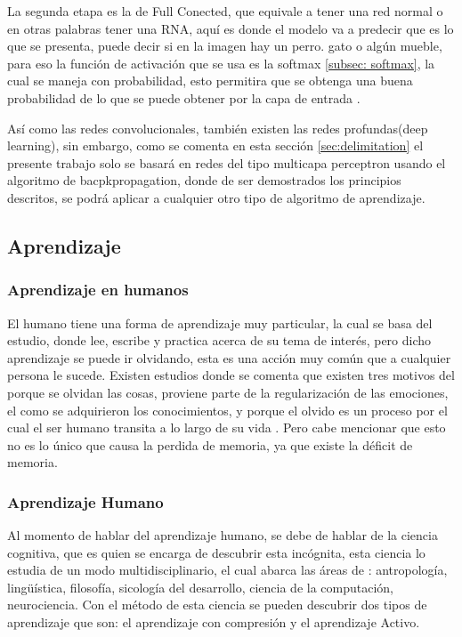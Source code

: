             La segunda etapa es la de Full Conected, que equivale a tener una red normal o en otras palabras tener una RNA, aqu\'i 
            es donde el modelo va a predecir que es lo que se presenta, puede decir si en la imagen hay un perro. gato o alg\'un mueble, 
            para eso la funci\'on de activaci\'on que se usa es la softmax \eqref{subsec: softmax}, la cual se maneja con probabilidad, esto
            permitira que se obtenga una buena probabilidad de lo que se puede obtener por la capa de entrada \cite{duran2017,Ortiz2020}.
            
            Así como las redes convolucionales, también existen las redes profundas(deep learning), sin embargo, como se comenta en esta 
            sección \eqref{sec:delimitation} el presente trabajo solo se basará en redes del tipo multicapa perceptron usando el algoritmo 
            de bacpkpropagation, donde de ser demostrados los principios descritos, se podrá aplicar a cualquier otro tipo de algoritmo 
            de aprendizaje.

\subsection{Aprendizaje}

    \subsubsection{Aprendizaje en humanos}
        El humano tiene una forma de aprendizaje muy particular, la cual se basa del estudio, donde lee, escribe y practica acerca de
        su tema de interés, pero dicho aprendizaje se puede ir olvidando, esta es una acción muy común que a cualquier persona le sucede.
        Existen estudios donde se comenta que existen tres motivos del porque se olvidan las cosas, proviene parte de la regularización de las emociones,
        el como se adquirieron los conocimientos, y porque el olvido es un proceso por el cual el ser humano transita a lo largo de su vida \cite{Nrby2015}. Pero cabe
        mencionar que esto no es lo único que causa la perdida de memoria, ya que existe la déficit de memoria. 

    \subsubsection{Aprendizaje Humano}
        Al momento de hablar del aprendizaje humano, se debe de hablar de la ciencia cognitiva, que es quien se encarga de descubrir esta incógnita,
        esta ciencia lo estudia de un modo multidisciplinario, el cual abarca las \'areas de \cite{bransford2000}: antropología, lingüística, 
        filosofía, sicología del desarrollo, ciencia de la computación, neurociencia.
        Con el método de esta ciencia se pueden descubrir dos tipos de aprendizaje que son: el aprendizaje con compresi\'on y el aprendizaje Activo.
        
